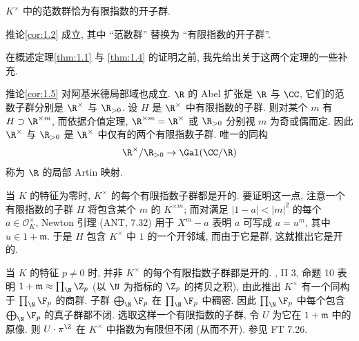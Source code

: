 \begin{theorem}[局部存在定理]\label{thm:1.4}
$K^{\times}$ 中的范数群恰为有限指数的开子群.
\end{theorem}

\begin{corollary}\label{cor:1.5}
推论\ref{cor:1.2} 成立, 其中 “范数群” 替换为 “有限指数的开子群”.
\end{corollary}

在概述定理\ref{thm:1.1} 与 \ref{thm:1.4} 的证明之前, 我先给出关于这两个定理的一些补充.

\begin{npara}\label{para:1.6}
推论\ref{cor:1.5} 对阿基米德局部域也成立. $\R$ 的 Abel 扩张是 $\R$ 与 $\CC$, 它们的范数子群分别是 $\R^{\times}$ 与 $\R_{>0}$. 设 $H$ 是 $\R^{\times}$ 中有限指数的子群. 则对某个 $m$ 有 $H\supset\R^{\times m}$, 而依据介值定理, $\R^{\times m}=\R^{\times}$ 或 $\R_{>0}$ 分别视 $m$ 为奇或偶而定. 因此 $\R^{\times}$ 与 $\R_{>0}$ 是 $\R^{\times}$ 中仅有的两个有限指数子群. 唯一的同构
\[
\R^{\times}/\R_{>0}\to\Gal(\CC/\R)
\]
称为 $\R$ 的局部 Artin 映射.
\end{npara}

\begin{npara}\label{para:1.7}
当 $K$ 的特征为零时, $K^{\times}$ 的每个有限指数子群都是开的. 要证明这一点, 注意一个有限指数的子群 $H$ 将包含某个 $m$ 的 $K^{\times m}$; 而对满足 $|1-a|<|m|^2$ 的每个 $a\in\mathcal{O}_K^{\times}$, Newton 引理 (ANT, 7.32) 用于 $X^m-a$ 表明 $a$ 可写成 $a=u^m$, 其中 $u\in1+\mathfrak{m}$. 于是 $H$ 包含 $K^{\times}$ 中 $1$ 的一个开邻域, 而由于它是群, 这就推出它是开的.

当 $K$ 的特征 $p\neq 0$ 时, 并非 $K^{\times}$ 的每个有限指数子群都是开的. \cite{Weil1967}, II 3, 命题 10 表明 $1+\mathfrak{m}\approx\prod_{\N}\Z_p$ (以 $\N$ 为指标的 $\Z_p$ 的拷贝之积), 由此推出 $K^{\times}$ 有一个同构于 $\prod_{\N}\F_p$ 的商群. 子群 $\bigoplus_{\N}\F_p$ 在 $\prod_{\N}\F_p$ 中稠密. 因此 $\prod_{\N}\F_p$ 中每个包含 $\bigoplus_{\N}\F_p$ 的真子群都不闭. 选取这样一个有限指数的子群, 令 $U$ 为它在 $1+\mathfrak{m}$ 中的原像. 则 $U\cdot\pi^{\Z}$ 在 $K^{\times}$ 中指数为有限但不闭 (从而不开). 参见 FT 7.26.
\end{npara}

